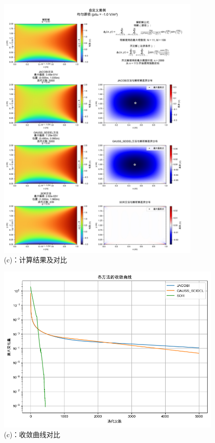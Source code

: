 \begin{figure}[H]
    \centering
    \includegraphics[width=0.9\textwidth]{Problem_1/figs/c_result.png}
    \caption{(c)：计算结果及对比}
\end{figure}

\begin{figure}[H]
    \centering
    \includegraphics[width=1.0\textwidth]{Problem_1/figs/c_convergence.png}
    \caption{(c)：收敛曲线对比}
\end{figure}
